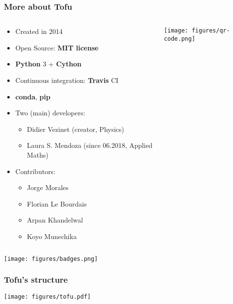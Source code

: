 \documentclass[10pt]{beamer}
\begin{document}
\begin{frame}
\frametitle{More about Tofu}

\begin{columns}
\begin{column}{0.65\textwidth}
\begin{itemize}
	\item Created in 2014
	\item Open Source:\textbf{ MIT license}
	\item \textbf{Python} 3 + \textbf{Cython}
	\item Continuous integration: \textbf{Travis} CI
	\item \textbf{conda}, \textbf{pip}
	\item Two (main) developers:
	\begin{itemize}
		\item Didier Vezinet (creator, Physics)
		\item Laura S. Mendoza (since 06.2018, Applied Maths)
	\end{itemize}
	\item Contributors:
	\begin{itemize}
		\item Jorge Morales
		\item Florian Le Bourdais
		\item Arpan Khandelwal
		\item Koyo Munechika
	\end{itemize}
\end{itemize}
\end{column}
\begin{column}{0.35\textwidth}
\begin{center}
	\texttt{[image: figures/qr-code.png]}
\end{center}
\end{column}
\end{columns}
\begin{center}
	\texttt{[image: figures/badges.png]}
\end{center}

\end{frame}

\begin{frame}
\frametitle{Tofu's structure}

\begin{center}
	\texttt{[image: figures/tofu.pdf]}
\end{center}

\end{frame}
\end{document}
